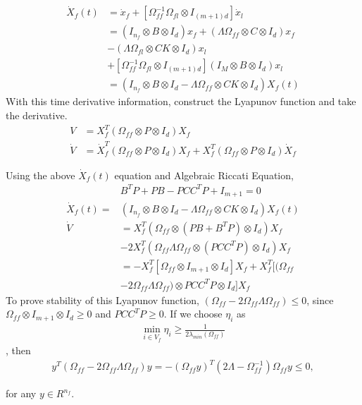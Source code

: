  \begin{align*} 
   \dot X_f(t) &= \dot x_f + [\Omega_{ff}^{-1} \Omega_{fl} \otimes I_{(m+1)d}] \dot x_l\\
   &= (I_{n_f}\otimes B \otimes I_d)x_f + (\Lambda \Omega_{ff}\otimes C \otimes I_d)x_f\\
   &- (\Lambda \Omega_{fl} \otimes CK \otimes I_d) x_l\\ &+[\Omega_{ff}^{-1} \Omega_{fl} \otimes I_{(m+1)d}] (I_M\otimes B \otimes I_d)x_l\\
   &= (I_{n_f}\otimes B \otimes I_d - \Lambda \Omega_{ff} \otimes CK \otimes I_d)X_f(t)
 \end{align*}
 With this time derivative information, construct the Lyapunov function and take the derivative.
 \begin{align*}
   V &= X_f^T (\Omega_{ff} \otimes P \otimes I_d) X_f\\
   \dot V &= \dot X_f^T (\Omega_{ff} \otimes P \otimes I_d) X_f + X_f^T (\Omega_{ff} \otimes P \otimes I_d) \dot X_f
 \end{align*}


 Using the above $\dot X_f(t)$ equation and Algebraic Riccati Equation, 
 \begin{align*}
   &B^T P + P B - PCC^TP + I_{m+1} =0\\
   \dot X_f(t) =& (I_{n_f}\otimes B \otimes I_d - \Lambda \Omega_{ff} \otimes CK \otimes I_d)X_f(t)\\
   \dot V &= X_f^T (\Omega_{ff} \otimes (PB + B^TP) \otimes I_d) X_f \\
   &-2 X_f^T (\Omega_{ff}\Lambda\Omega_{ff} \otimes (PCC^TP) \otimes I_d) X_f\\
   &= - X_f^T [\Omega_{ff}\otimes I_{m+1} \otimes I_d] X_f + X_f^T [(\Omega_{ff} \\
   &- 2\Omega_{ff}\Lambda\Omega_{ff})\otimes PCC^TP \otimes I_d]X_f
 \end{align*}
 To prove stability of this Lyapunov function, $(\Omega_{ff} - 2\Omega_{ff}\Lambda\Omega_{ff}) \leq 0$, since $\Omega_{ff}\otimes I_{m+1} \otimes I_d \geq 0$ and $PCC^TP \geq 0$. If we choose $\eta_i$ as
 \begin{align*}
   \min_{i\in V_f} \eta_i \geq \frac{1}{2\lambda_{min}(\Omega_{ff})}
 \end{align*}, then 
 \begin{align*}
   y^T(\Omega_{ff}- 2\Omega_{ff}\Lambda\Omega_{ff})y = -(\Omega_{ff}y)^T(2\Lambda - \Omega_{ff}^{-1})\Omega_{ff}y \leq 0,
 \end{align*}
 
 for any $y \in R^{n_f}$.